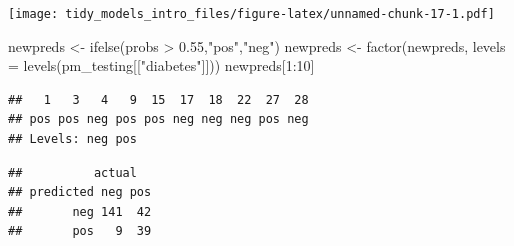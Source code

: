 \documentclass[
]{article}
\newenvironment{Shaded}{\begin{snugshade}}{\end{snugshade}}
\newcommand{\AttributeTok}[1]{\textcolor[rgb]{0.77,0.63,0.00}{#1}}
\newcommand{\DecValTok}[1]{\textcolor[rgb]{0.00,0.00,0.81}{#1}}
\newcommand{\FloatTok}[1]{\textcolor[rgb]{0.00,0.00,0.81}{#1}}
\newcommand{\FunctionTok}[1]{\textcolor[rgb]{0.00,0.00,0.00}{#1}}
\newcommand{\NormalTok}[1]{#1}
\newcommand{\OtherTok}[1]{\textcolor[rgb]{0.56,0.35,0.01}{#1}}
\newcommand{\SpecialCharTok}[1]{\textcolor[rgb]{0.00,0.00,0.00}{#1}}
\newcommand{\StringTok}[1]{\textcolor[rgb]{0.31,0.60,0.02}{#1}}
\begin{document}
\begin{Shaded}
\end{Shaded}

\texttt{[image: tidy\_models\_intro\_files/figure-latex/unnamed-chunk-17-1.pdf]}

\begin{Shaded}
\begin{Highlighting}[]
\NormalTok{newpreds }\OtherTok{\textless{}{-}} \FunctionTok{ifelse}\NormalTok{(probs }\SpecialCharTok{\textgreater{}} \FloatTok{0.55}\NormalTok{,}\StringTok{"pos"}\NormalTok{,}\StringTok{"neg"}\NormalTok{)}
\NormalTok{newpreds }\OtherTok{\textless{}{-}} \FunctionTok{factor}\NormalTok{(newpreds, }\AttributeTok{levels =} \FunctionTok{levels}\NormalTok{(pm\_testing[[}\StringTok{"diabetes"}\NormalTok{]]))}
\NormalTok{newpreds[}\DecValTok{1}\SpecialCharTok{:}\DecValTok{10}\NormalTok{]}
\end{Highlighting}
\end{Shaded}

\begin{verbatim}
##   1   3   4   9  15  17  18  22  27  28 
## pos pos neg pos pos neg neg neg pos neg 
## Levels: neg pos
\end{verbatim}

\begin{Shaded}
\end{Shaded}

\begin{verbatim}
##          actual
## predicted neg pos
##       neg 141  42
##       pos   9  39
\end{verbatim}

\begin{Shaded}
\end{Shaded}
\end{document}
